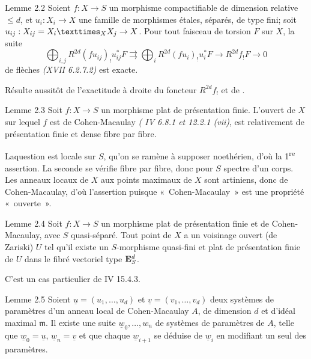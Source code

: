 \documentclass[10pt]{../fichiers-configuration-latex/smfart}
\begin{document}
\begin{enonce*}{Lemme 2.2}
Soient $f:X\rightarrow S$ un morphisme compactifiable de dimension
relative $\leq d$, et $u_{i}:X_{i}\rightarrow X$ une famille de
morphismes étales, séparés, de type fini; soit
$u_{ij}:X_{ij}=\fprod{X_{i}}{X_{j}}{X}\rightarrow X$. Pour tout
faisceau de torsion $F$ sur $X$, la suite
$$
\bigoplus_{i,j} R^{2d}(fu_{ij})_{!}u^{\ast}_{ij}F\rightrightarrows
\bigoplus_{i} R^{2d}(fu_{i})_{!}u^{\ast}_{i}F\rightarrow
R^{2d}f_{!}F\rightarrow 0
$$
de flèches \emph{(XVII 6.2.7.2)} est exacte.
\end{enonce*}

Résulte aussitôt de l'exactitude à droite du foncteur $R^{2d}f_{!}$ et
de .

\begin{enonce*}{Lemme 2.3}
Soit $f:X\rightarrow S$ un morphisme plat de présentation
finie. L'ouvert de $X$ sur lequel $f$ est de Cohen-Macaulay \emph{(\EGA
IV 6.8.1 et 12.2.1 (vii)}, est relativement de présentation finie et
dense fibre par fibre.
\end{enonce*}

La\pageoriginale question est locale sur $S$, qu'on se ramène à
supposer noethérien, d'où la 1\textsuperscript{re} assertion. La seconde se vérifie
fibre par fibre, donc pour $S$ spectre d'un corps. Les anneaux locaux
de $X$ aux points maximaux de $X$ sont artiniens, donc de
Cohen-Macaulay, d'où l'assertion puisque « Cohen-Macaulay »  est
une propriété « ouverte ».

\begin{enonce*}{Lemme 2.4}
Soit $f:X\rightarrow S$ un morphisme plat de présentation finie et de
Cohen-Macaulay, avec $S$ quasi-séparé. Tout point de $X$ a un
voisinage ouvert (de Zariski) $U$ tel qu'il existe un $S$-morphisme
quasi-fini et plat de présentation finie de $U$ dans le fibré vectoriel
type $\mathbf{E}^{d}_{S}$.
\end{enonce*}

C'est un cas particulier de \EGA IV 15.4.3.

\begin{enonce*}{Lemme 2.5}
Soient $\underline{u}=(u_{1},\ldots,u_{d})$ et $\underline{v}=(v_{1},\ldots,v_{d})$
deux systèmes de paramètres d'un anneau local de Cohen-Macaulay $A$,
de dimension $d$ et d'idéal maximal $\mathfrak{m}$. Il existe une suite
$\underline{w}_{0},\ldots,w_{n}$ de systèmes de paramètres de $A$, telle que
$\underline{w}_{0}=\underline{u}$, $\underline{w}_{n}=\underline{v}$ et que
chaque $\underline{w}_{i+1}$ se
déduise de $\underline{w}_{i}$ en modifiant un seul des paramètres.
\end{enonce*}
\end{document}
